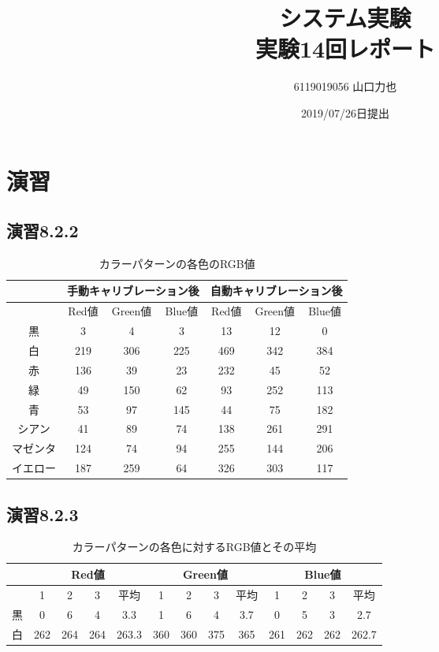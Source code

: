 \documentclass{jarticle}
\title{{システム実験}\\実験14回レポート}
\author{6119019056 山口力也}
\date{2019/07/26日提出}
\begin{document}
\maketitle
\section{演習}

\subsection{演習8.2.2}

\begin{table}[H]
\caption{カラーパターンの各色のRGB値}
	\begin{center}
		\begin{tabular}{|c|c|c|c|c|c|c|}\hline 
			& \multicolumn{3}{c|}{手動キャリブレーション後}&\multicolumn{3}{c|}{自動キャリブレーション後} \\ \hline 
			& Red値 & Green値 & Blue値 & Red値 & Green値 & Blue値 \\ \hline 
		黒 & 3 & 4 & 3 & 13 & 12 & 0  \\ \hline
		白 & 219 & 306 & 225 & 469 & 342 & 384  \\ \hline 
		赤 & 136 & 39 & 23 & 232 & 45 & 52  \\ \hline
		緑 & 49 & 150 & 62& 93 & 252 & 113  \\ \hline
		青 & 53 & 97 & 145 & 44 & 75 & 182  \\ \hline
		シアン & 41 & 89 & 74 & 138 & 261 & 291  \\ \hline
		マゼンタ & 124 & 74 & 94 & 255 & 144 & 206  \\ \hline
		イエロー & 187 & 259 & 64 & 326 & 303 & 117  \\ \hline
		\end{tabular}
	\end{center}
\label{table:enshu8-2-3} 
\end{table}

\subsection{演習8.2.3}

\begin{table}[H]
\caption{カラーパターンの各色に対するRGB値とその平均}
	\begin{center}
		\begin{tabular}{|c|c|c|c|c|c|c|c|c|c|c|c|c|}\hline 
		& \multicolumn{4}{c|}{Red値} & \multicolumn{4}{c|}{Green値} & \multicolumn{4}{c|}{Blue値} \\ \hline
			& 1 & 2 & 3 &平均& 1 & 2 & 3 &平均& 1 & 2 & 3 &平均 \\ \hline
		黒 & 0 & 6 & 4 & 3.3& 1 & 6 & 4 & 3.7& 0 & 5 & 3 & 2.7 \\ \hline
		白 &262&264&264&263.3&360&360&375&365&261&262&262&262.7 \\ \hline
		\end{tabular}
	\end{center}
\label{table:enshu8-2-5} 
\end{table}
\end{document}
